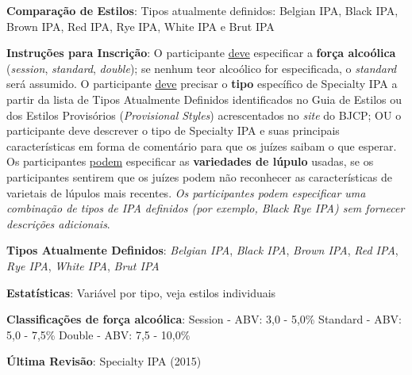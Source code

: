 \textbf{Comparação de Estilos}: Tipos atualmente definidos: Belgian IPA, Black IPA, Brown IPA, Red IPA, Rye IPA, White IPA e Brut IPA

\textbf{Instruções para Inscrição}: O participante \underline{deve} especificar a \textbf{força alcoólica} (\textit{session}, \textit{standard}, \textit{double}); se nenhum teor alcoólico for especificada, o \textit{standard} será assumido. O participante \underline{deve} precisar o \textbf{tipo} específico de Specialty IPA a partir da lista de Tipos Atualmente Definidos identificados no Guia de Estilos ou dos Estilos Provisórios (\textit{Provisional Styles}) acrescentados no \textit{site} do BJCP; OU o participante deve descrever o tipo de Specialty IPA e suas principais características em forma de comentário para que os juízes saibam o que esperar. Os participantes \underline{podem} especificar as \textbf{variedades de lúpulo} usadas, se os participantes sentirem que os juízes podem não reconhecer as características de varietais de lúpulos mais recentes. \textit{Os participantes podem especificar uma combinação de tipos de IPA definidos (por exemplo, Black Rye IPA) sem fornecer descrições adicionais}.

\textbf{Tipos Atualmente Definidos}: \textit{Belgian IPA}, \textit{Black IPA}, \textit{Brown IPA}, \textit{Red IPA}, \textit{Rye IPA}, \textit{White IPA}, \textit{Brut IPA}

\textbf{Estatísticas}: Variável por tipo, veja estilos individuais

\textbf{Classificações de força alcoólica}: Session - ABV: 3,0 - 5,0\% Standard - ABV: 5,0 - 7,5\% Double - ABV: 7,5 - 10,0\%

\textbf{Última Revisão}: Specialty IPA (2015)